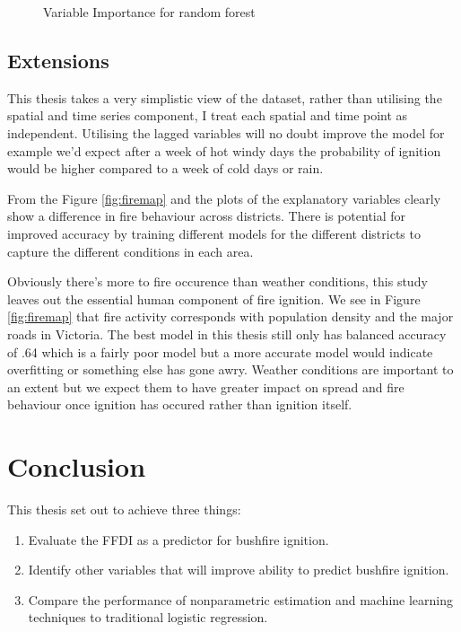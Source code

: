 \documentclass{article}
\begin{document}
\begin{figure}[h]
	\centering 
	\caption{Variable Importance for random forest} 
	\label{fig:rocrf} 
\end{figure}

\subsection{Extensions}

This thesis takes a very simplistic view of the dataset, rather than utilising the spatial and time series component, I treat each spatial and time point as independent. Utilising the lagged variables will no doubt improve the model for example we'd expect after a week of hot windy days the probability of ignition would be higher compared to a week of cold days or rain. 

From the Figure \ref{fig:firemap} and the plots of the explanatory variables clearly show a difference in fire behaviour across districts. There is potential for improved accuracy by training different models for the different districts to capture the different conditions in each area. 

Obviously there's more to fire occurence than weather conditions, this study leaves out the essential human component of fire ignition. We see in Figure \ref{fig:firemap} that fire activity corresponds with population density and the major roads in Victoria. The best model in this thesis still only has balanced accuracy of .64 which is a fairly poor model but a more accurate model would indicate overfitting or something else has gone awry.  Weather conditions are important to an extent but we expect them to have greater impact on spread and fire behaviour once ignition has occured rather than ignition itself. 


\section{Conclusion}

This thesis set out to achieve three things:
\begin{enumerate}
\item Evaluate the FFDI as a predictor for bushfire ignition.
\item Identify other variables that will improve ability to predict bushfire ignition.
\item Compare the performance of nonparametric estimation and machine learning techniques to traditional logistic regression.
\end{enumerate}
\end{document}
